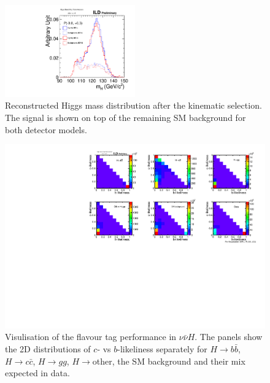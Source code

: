 \begin{figure}[htbp]
\begin{center}
 \includegraphics[width=0.5\textwidth]{Performance/fig/IDRplot5.pdf}
\end{center}
\caption{Reconstructed Higgs mass distribution after the kinematic selection. The signal is shown on top of the remaining SM background for both detector models.
}
\label{fig:Hbbccgg:mh}
\end{figure}


\begin{figure}[htbp]
\begin{center}
 \includegraphics[width=\textwidth]{Performance/fig/IDRplot4.pdf}
\end{center}
\caption{Visulisation of the flavour tag performance in $\nu\bar{\nu} H$. The panels show the 2D distributions of $c$- vs $b$-likeliness separately for $H \to b\bar{b}$, $H \to c\bar{c}$, $H \to gg$, $H \to$other, the SM background and their mix expected in data.
}
\label{fig:Hbbccgg:likeli}
\end{figure}

